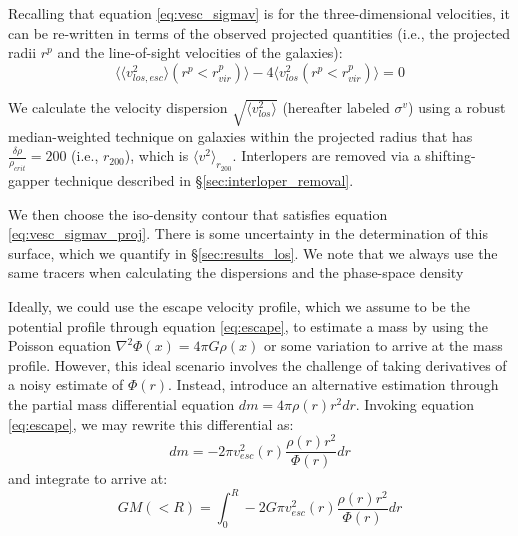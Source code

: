 \documentclass[iop]{emulateapj}
\begin{document}
        Recalling that equation \ref{eq:vesc_sigmav} is for the three-dimensional velocities, it can be re-written in terms of the observed projected quantities (i.e., the projected radii $r^p$ and the line-of-sight velocities of the galaxies):
        \begin{equation}
        \langle \langle v_{los,esc}^2 \rangle (r^p<r^p_{vir}) \rangle - 4 \langle v^2_{los}(r^p<r^p_{vir}) \rangle = 0
        \label{eq:vesc_sigmav_proj}
        \end{equation}      

        We calculate the velocity dispersion $\sqrt{\langle v_{los}^2 \rangle}$ (hereafter labeled  $\sigma^{v}$) using a robust median-weighted technique on galaxies within the projected radius that has $\frac{\delta \rho}{\rho_{crit}} = 200$ (i.e., $r_{200}$), which is $\langle v^2 \rangle_{r_{200}}$. Interlopers are removed via a shifting-gapper technique described in \S \ref{sec:interloper_removal}.
        
        We then choose the iso-density contour that satisfies equation \ref{eq:vesc_sigmav_proj}. There is some uncertainty in the determination of this surface, which we quantify in \S \ref{sec:results_los}. We note that we always use the same tracers when calculating the dispersions and the phase-space density

        Ideally, we could use the escape velocity profile, which we assume to be the potential profile through equation \ref{eq:escape}, to estimate a mass by using the Poisson equation $\nabla^2 \Phi(x) = 4 \pi G \rho(x)$ or some variation to arrive at the mass profile. However, this ideal scenario involves the challenge of taking derivatives of a noisy estimate of $\Phi (r)$. Instead, \citet{Diaferio97} introduce an alternative estimation through the partial mass differential equation $dm = 4 \pi \rho (r) r^2 dr$. Invoking equation \ref{eq:escape}, we may rewrite this differential as:
        \begin{equation}
        dm = -2 \pi v_{esc}^2(r) \frac{\rho (r) r^2}{\Phi (r)} dr \nonumber
        \end{equation}
        and integrate to arrive at:
        \begin{equation}
        G M(<R) = \int_0^R -2 G \pi v_{esc}^2(r) \frac{\rho (r) r^2}{\Phi (r)} dr
        \label{eq:m_caustic_full}
        \end{equation} 
        
\end{document}
